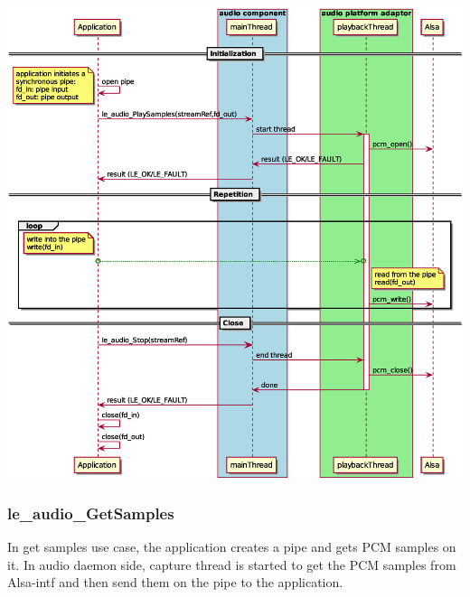 \begin{DoxyImageNoCaption}
  \mbox{\includegraphics[width=\textwidth,height=\textheight/2,keepaspectratio=true]{le_audio_PlaySamples}}
\end{DoxyImageNoCaption}
\hypertarget{c_SDD_audio_le_audio_GetSamples}{}\subsubsection{le\+\_\+audio\+\_\+\+Get\+Samples}\label{c_SDD_audio_le_audio_GetSamples}
In get samples use case, the application creates a pipe and gets P\+CM samples on it. In audio daemon side, capture thread is started to get the P\+CM samples from Alsa-\/intf and then send them on the pipe to the application.


